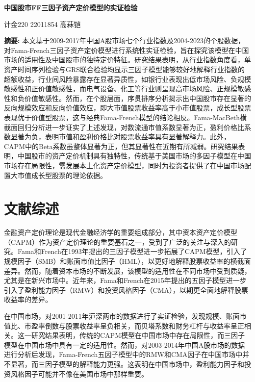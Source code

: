 \documentclass[12pt, a4paper]{article}
\begin{document}
\begin{center}
\LARGE\textbf{中国股市FF三因子资产定价模型的实证检验}

\vspace{1cm}
\large 计金220 22011854 高菻铠
\end{center}

\noindent \textbf{摘要:} 本文基于2009-2017年中国A股市场七个行业指数及2004-2023的个股数据，对Fama-French三因子资产定价模型进行系统性实证检验，旨在探究该模型在中国市场的适用性及中国股市的独特定价特征。研究结果表明，从行业指数角度看，单资产时间序列检验与GRS联合检验均显示三因子模型能够较好地解释行业指数的超额收益，行业间风险暴露存在显著异质性，如银行业表现出低市场风险、负规模敏感性和正价值敏感性，而电气设备、化工等行业则呈现高市场风险、正规模敏感性和负价值敏感性。然而，在个股层面，序贯排序分析揭示出中国股市存在显著的反向规模效应和反向价值效应，即大市值股票收益率高于小市值股票，成长型股票表现优于价值型股票，这与经典Fama-French模型的结论相反。Fama-MacBeth横截面回归分析进一步证实了上述发现，对数流通市值系数显著为正，盈利价格比系数显著为负，表明市值和盈利价格比对股票收益率具有显著解释力。此外，CAPM中的Beta系数虽整体显著为正，但其显著性在近期有所减弱。研究结果表明，中国股市的资产定价机制具有独特性，传统基于美国市场的多因子模型在中国市场存在局限性，需发展本土化资产定价模型，同时为投资者提供了在中国市场配置大市值成长型股票的理论依据。

\section{文献综述}

金融资产定价理论是现代金融经济学的重要组成部分，其中资本资产定价模型（CAPM）作为资产定价理论的重要基石之一，受到了广泛的关注与深入的研究。Fama和French在1993年提出的三因子模型进一步拓展了CAPM模型，引入了规模因子（SMB）和账面市值比因子（HML），以更好地解释股票收益率的横截面差异。然而，随着资本市场的不断发展，该模型的适用性在不同市场中受到质疑，尤其是在新兴市场中。近年来，Fama和French在2015年提出的五因子模型进一步引入了盈利能力因子（RMW）和投资风格因子（CMA），以期更全面地解释股票收益率的差异。

在中国市场，\citet{zhang2014ff}对2001-2011年沪深两市的数据进行了实证检验，发现规模、账面市值比、市盈率倒数与股票收益率呈负相关，而贝塔系数和财务杠杆与收益率呈正相关。这一研究结果表明，传统的CAPM模型在中国市场中存在局限性，而三因子模型在中国市场中具有一定的适用性。然而，\citet{zhao2016fama}对2003-2014年中国A股市场的数据进行分析后发现，Fama-French五因子模型中的RMW和CMA因子在中国市场中并不显著，而三因子模型的解释能力更强。这表明在中国市场中，盈利能力因子和投资风格因子可能并不像在美国市场中那样重要。
\end{document}

